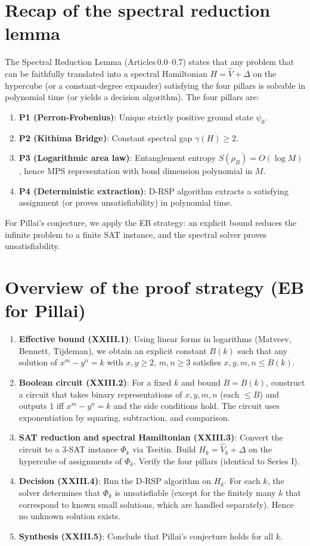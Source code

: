 \documentclass[11pt,a4paper]{article}
\begin{document}
\section{Recap of the spectral reduction lemma}

The Spectral Reduction Lemma (Articles 0.0–0.7) states that any problem that can be faithfully translated into a spectral Hamiltonian $H = \hat{V} + \Delta$ on the hypercube (or a constant‑degree expander) satisfying the four pillars is solvable in polynomial time (or yields a decision algorithm). The four pillars are:

\begin{enumerate}
\item \textbf{P1 (Perron‑Frobenius)}: Unique strictly positive ground state $\psi_0$.
\item \textbf{P2 (Kithima Bridge)}: Constant spectral gap $\gamma(H) \ge 2$.
\item \textbf{P3 (Logarithmic area law)}: Entanglement entropy $S(\rho_B)=O(\log M)$, hence MPS representation with bond dimension polynomial in $M$.
\item \textbf{P4 (Deterministic extraction)}: D‑RSP algorithm extracts a satisfying assignment (or proves unsatisfiability) in polynomial time.
\end{enumerate}

For Pillai's conjecture, we apply the EB strategy: an explicit bound reduces the infinite problem to a finite SAT instance, and the spectral solver proves unsatisfiability.

\section{Overview of the proof strategy (EB for Pillai)}

\begin{enumerate}
\item \textbf{Effective bound (XXIII.1)}: Using linear forms in logarithms (Matveev, Bennett, Tijdeman), we obtain an explicit constant $B(k)$ such that any solution of $x^m - y^n = k$ with $x,y \ge 2$, $m,n \ge 3$ satisfies $x,y,m,n \le B(k)$.
\item \textbf{Boolean circuit (XXIII.2)}: For a fixed $k$ and bound $B = B(k)$, construct a circuit that takes binary representations of $x,y,m,n$ (each $\le B$) and outputs $1$ iff $x^m - y^n = k$ and the side conditions hold. The circuit uses exponentiation by squaring, subtraction, and comparison.
\item \textbf{SAT reduction and spectral Hamiltonian (XXIII.3)}: Convert the circuit to a 3‑SAT instance $\Phi_k$ via Tseitin. Build $H_k = \hat{V}_k + \Delta$ on the hypercube of assignments of $\Phi_k$. Verify the four pillars (identical to Series I).
\item \textbf{Decision (XXIII.4)}: Run the D‑RSP algorithm on $H_k$. For each $k$, the solver determines that $\Phi_k$ is unsatisfiable (except for the finitely many $k$ that correspond to known small solutions, which are handled separately). Hence no unknown solution exists.
\item \textbf{Synthesis (XXIII.5)}: Conclude that Pillai's conjecture holds for all $k$.
\end{enumerate}
\end{document}
